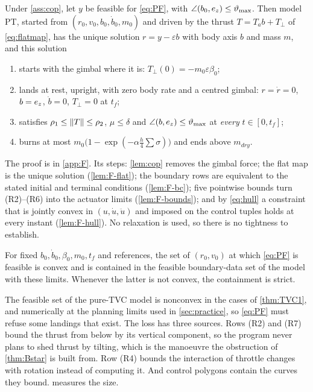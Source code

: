 \begin{theorem}\label{thm:F}
Under \cref{ass:cop}, let $y$ be feasible for \eqref{eq:PF}, with $\angle(b_0,e_z)\le\vartheta_{\max}$. Then model PT, started from
$(r_0,v_0,b_0,\dot b_0,m_0)$ and driven by the thrust $T=T_ab+T_\perp$ of \eqref{eq:flatmap}, has the unique solution $r=y-\varepsilon b$ with
body axis $b$ and mass $m$, and this solution
\begin{enumerate}[leftmargin=*,itemsep=1pt,label=(\roman*)]
\item starts with the gimbal where it is: $T_\perp(0)=-m_0\varepsilon\beta_0$;
\item lands at rest, upright, with zero body rate and a centred gimbal: $r=\dot r=0$, $b=e_z$, $\dot b=0$, $T_\perp=0$ at $t_f$;
\item satisfies $\rho_1\le\lVert T\rVert\le\rho_2$, $\mu\le\delta$ and $\angle(b,e_z)\le\vartheta_{\max}$ at \emph{every} $t\in[0,t_f]$;
\item burns at most $m_0\bigl(1-\exp(-\alpha\tfrac h4\sum\sigma)\bigr)$ and ends above $m_{dry}$.
\end{enumerate}
\Sunref
\end{theorem}
The proof is in \cref{app:F}. Its steps: \cref{lem:cop} removes the gimbal force; the flat map is the unique solution
(\cref{lem:F-flat}); the boundary rows are equivalent to the stated initial and terminal conditions (\cref{lem:F-bc}); five pointwise
bounds turn (R2)--(R6) into the actuator limits (\cref{lem:F-bounds}); and by \eqref{eq:hull} a constraint that is jointly convex in
$(u,\dot u,\ddot u)$ and imposed on the control tuples holds at every instant (\cref{lem:F-hull}). No relaxation is used, so there is
no tightness to establish.

\begin{proposition}\label{prop:F-inc}
For fixed $b_0,\dot b_0,\beta_0,m_0,t_f$ and references, the set of $(r_0,v_0)$ at which \eqref{eq:PF} is feasible is convex and is
contained in the feasible boundary-data set of the model with these limits. Whenever the latter is not convex, the containment is
strict.\Sunref
\end{proposition}
The feasible set of the pure-TVC model is nonconvex in the cases of \cref{thm:TVC1}, and numerically at the planning limits used in
\cref{sec:practice}, so \eqref{eq:PF} must refuse some landings that exist. The loss has three sources. Rows (R2) and (R7) bound the
thrust from below by its vertical component, so the program never plans to shed thrust by tilting, which is the manoeuvre the
obstruction of \cref{thm:Bstar} is built from. Row (R4) bounds the interaction of throttle changes with rotation instead of computing
it. And control polygons contain the curves they bound.  measures the size.

